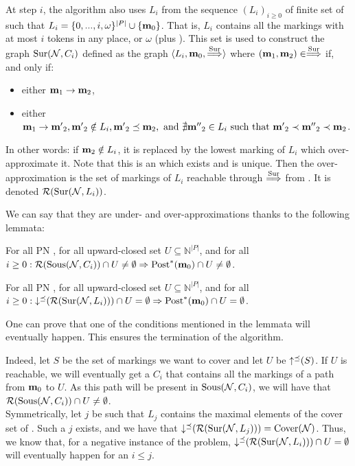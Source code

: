 At step $i$, the algorithm also uses $L_i$ from the sequence $(L_i)_{i \geq 0}$ of finite set of \omarks such that $L_i = \{0, ..., i, \omega \}^{|P|} \cup \{\mathbf{m}_0\}$.
That is, $L_i$ contains all the markings with at most $i$ tokens in any place, or $\omega$ (plus \mari).
This set is used to construct the graph $\operatorname{Sur}(\mathcal{N}, C_i)$ defined as the graph $\langle L_i, \mathbf{m}_0, \stackrel{\operatorname{Sur}}{\Longrightarrow} \rangle$ where $(\mathbf{m}_1, \mathbf{m}_2) \in \stackrel{\operatorname{Sur}}{\Longrightarrow}$ if, and only if:
\begin{itemize}
  \item either $\mathbf{m}_1 \rightarrow \mathbf{m}_2$,
  \item either $\mathbf{m}_1 \rightarrow \mathbf{m'}_2, \mathbf{m'}_2 \notin L_i, \mathbf{m'}_2 \preceq \mathbf{m}_2, \text{ and } \nexists \mathbf{m''}_2 \in L_i \text{ such that } \mathbf{m'}_2 \prec \mathbf{m''}_2 \prec \mathbf{m}_2$.
\end{itemize}
In other words: if $\mathbf{m}_2 \notin L_i$, it is replaced by the lowest marking of $L_i$ which over-approximate it.
Note that this is an \omark which exists and is unique. 
Then the over-approximation is the set of markings of $L_i$ reachable through $\stackrel{\operatorname{Sur}}{\Longrightarrow}$ from \mari. It is denoted $\operatorname{\mathcal{R}}(\operatorname{Sur}(\mathcal{N}, L_i))$.

We can say that they are under- and over-approximations thanks to the following lemmata:
\begin{lemm}
  For all \ac{PN} \NPTm, for all upward-closed set $U \subseteq \mathbb{N}^{|P|}$, and for all $i \geq 0: \operatorname{\mathcal{R}}(\operatorname{Sous}(\mathcal{N},C_i)) \cap U \neq \emptyset \Rightarrow \operatorname{Post}^*(\mathbf{m}_0) \cap U \neq \emptyset$.
\end{lemm}
\begin{lemm}
  For all \ac{PN} \NPTm, for all upward-closed set $U \subseteq \mathbb{N}^{|P|}$, and for all $i \geq 0: \operatorname{\downarrow^\preceq}(\operatorname{\mathcal{R}}(\operatorname{Sur}(\mathcal{N},L_i))) \cap U = \emptyset \Rightarrow \operatorname{Post}^*(\mathbf{m}_0) \cap U = \emptyset$.
\end{lemm}

One can prove that one of the conditions mentioned in the lemmata will eventually happen.
This ensures the termination of the algorithm.

Indeed, let $S$ be the set of markings we want to cover and let $U$ be $\operatorname{\uparrow^\preceq}(S)$.
If $U$ is reachable, we will eventually get a $C_i$ that contains all the markings of a path from $\mathbf{m}_0$ to $U$.
As this path will be present in $\operatorname{Sous}(\mathcal{N}, C_i)$, we will have that $\operatorname{\mathcal{R}}(\operatorname{Sous}(\mathcal{N},C_i)) \cap U \neq \emptyset$.\\
Symmetrically, let $j$ be such that $L_j$ contains the maximal elements of the cover set of \N.
Such a $j$ exists, and we have that $\operatorname{\downarrow^\preceq}(\operatorname{\mathcal{R}}(\operatorname{Sur}(\mathcal{N},L_j))) = \operatorname{Cover}(\mathcal{N})$.
Thus, we know that, for a negative instance of the problem, $\operatorname{\downarrow^\preceq}(\operatorname{\mathcal{R}}(\operatorname{Sur}(\mathcal{N},L_i))) \cap U = \emptyset$ will eventually happen for an $i \leq j$.


